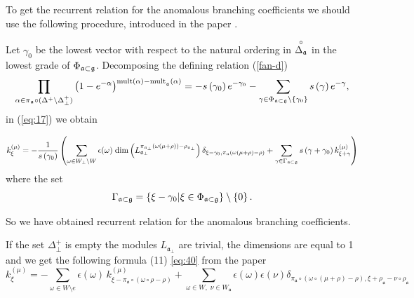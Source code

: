 \documentclass[a4paper,12pt]{article}
\theoremstyle{definition} \newtheorem{Def}{Definition}
\begin{document}
To get the recurrent relation for the anomalous branching coefficients we should use the following procedure, introduced in the paper \cite{ilyin812pbc}.

Let $\gamma
_{0} $ be the lowest vector with respect to the natural ordering in $%
\overset{\circ }{\Delta _{\frak{a}}}$ in the lowest grade of $\Phi _{\frak{a}\subset \frak{g}}$. Decomposing the defining relation (\ref{fan-d})
\begin{equation}
  \label{eq:18}
  \prod_{\alpha\in \pi_{\mathfrak{a}}\circ (\Delta^{+}\setminus \Delta^{+}_{\bot})}\left(
    1-e^{-\alpha }\right) ^{\mathrm{{mult}\left( \alpha \right) -{mult}}_{\frak{a%
      }}\mathrm{\left( \alpha \right) }}=-s\left( \gamma _{0}\right) e^{-\gamma
    _{0}}-\sum_{\gamma \in \Phi _{\frak{a}\subset \frak{g}}\setminus \left\{\gamma_{0}\right\}}s\left( \gamma \right) e^{-\gamma },
\end{equation}
in (\ref{eq:17}) we obtain

\begin{equation}
  k_{\xi }^{\left( \mu \right) }=
  -\frac{1}{s\left( \gamma _{0}\right) }
  \left(
    \sum_{\omega\in W_{\bot}\backslash W} \epsilon(\omega)\; \mathrm{dim}
    \left(L^{\pi_{\mathfrak{a}_{\bot}}(\omega(\mu+\rho))-\rho_{\mathfrak{a}_{\bot}}}_{\mathfrak{a}_{\bot}}\right)
    \delta_{\xi-\gamma_0,\pi_{\mathfrak{a}}(\omega(\mu+\rho)-\rho)}+
    \sum_{\gamma \in \Gamma _{\frak{a}\subset \frak{g}}} s\left( \gamma +\gamma _{0}\right) k_{\xi+\gamma }^{\left( \mu \right) }
  \right)
\label{recurrent relation}
\end{equation}
where the set
\begin{equation}
\Gamma _{\frak{a}\subset \frak{g}}=\left\{ \xi -\gamma _{0}|\xi \in \Phi _{%
\frak{a}\subset \frak{g}}\right\} \setminus \left\{ 0\right\} .
\label{fan-defined}
\end{equation}

So we have obtained recurrent relation for the anomalous branching coefficients.

If the set $\Delta_{\bot}^{+}$ is empty the modules $L_{\mathfrak{a}_{\bot}}$ are trivial, the dimensions are equal to 1 and we get the following formula (11) \eqref{eq:40} from the paper \cite{ilyin812pbc}
\begin{equation}
  \label{eq:40}
  k_{\xi }^{\left( \mu \right) }=-\sum_{\omega\in W\setminus e} \epsilon(\omega)\, k^{(\mu)}_{\xi-\pi_{\mathfrak{a}}\circ (\omega\circ \rho - \rho)} +
  \sum_{\omega\in W,\; \nu\in W_{\mathfrak{a}}} \epsilon(\omega)\epsilon(\nu)\delta_{\pi_{\mathfrak{a}}\circ (\omega\circ (\mu+\rho)-\rho),\xi+\rho_{\mathfrak{a}}-\nu\circ \rho_{\mathfrak{a}}}
\end{equation}
\end{document}
